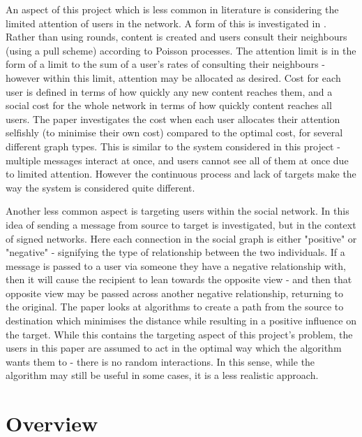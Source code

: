 \documentclass[bsc,frontabs,twoside,singlespacing,parskip,deptreport]{infthesis}     %
\begin{document}
An aspect of this project which is less common in literature is considering the limited attention of users in the network. A form of this is investigated in \cite{AllocatingAttention}. Rather than using rounds, content is created and users consult their neighbours (using a pull scheme) according to Poisson processes. The attention limit is in the form of a limit to the sum of a user's rates of consulting their neighbours - however within this limit, attention may be allocated as desired. Cost for each user is defined in terms of how quickly any new content reaches them, and a social cost for the whole network in terms of how quickly content reaches all users. The paper investigates the cost when each user allocates their attention selfishly (to minimise their own cost) compared to the optimal cost, for several different graph types. This is similar to the system considered in this project - multiple messages interact at once, and users cannot see all of them at once due to limited attention. However the continuous process and lack of targets make the way the system is considered quite different.

Another less common aspect is targeting users within the social network. In \cite{TargetedSignedNetworks} this idea of sending a message from source to target is investigated, but in the context of signed networks. Here each connection in the social graph is either "positive" or "negative" - signifying the type of relationship between the two individuals. If a message is passed to a user via someone they have a negative relationship with, then it will cause the recipient to lean towards the opposite view - and then that opposite view may be passed across another negative relationship, returning to the original. The paper looks at algorithms to create a path from the source to destination which minimises the distance while resulting in a positive influence on the target. While this contains the targeting aspect of this project's problem, the users in this paper are assumed to act in the optimal way which the algorithm wants them to - there is no random interactions. In this sense, while the algorithm may still be useful in some cases, it is a less realistic approach.

\section{Overview}
%
%
\end{document}
